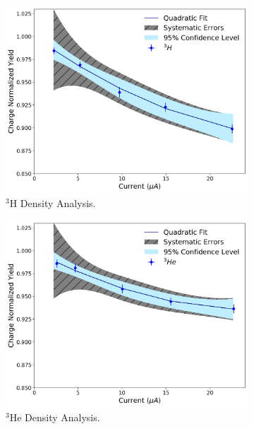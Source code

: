 \documentclass[review,numbers,sort&compress]{elsarticle}
\begin{document}
\begin{figure}[h]
\begin{center}
  \begin{subfigure}{0.45\textwidth}
    \centering\includegraphics[width=\textwidth]{images/tritium_data.pdf}
    \caption{$^{3}$H Density Analysis. }
    \label{fig:tritium_data}
  \end{subfigure}
  \begin{subfigure}{0.45\textwidth}
    \centering\includegraphics[width=\textwidth]{images/helium_data.pdf}
    \caption{$^{3}$He Density Analysis.}
    \label{fig:helium_data}
  \end{subfigure}
  \begin{subfigure}{0.45\textwidth}

\end{subfigure}
\end{center}
\end{figure}
\end{document}
